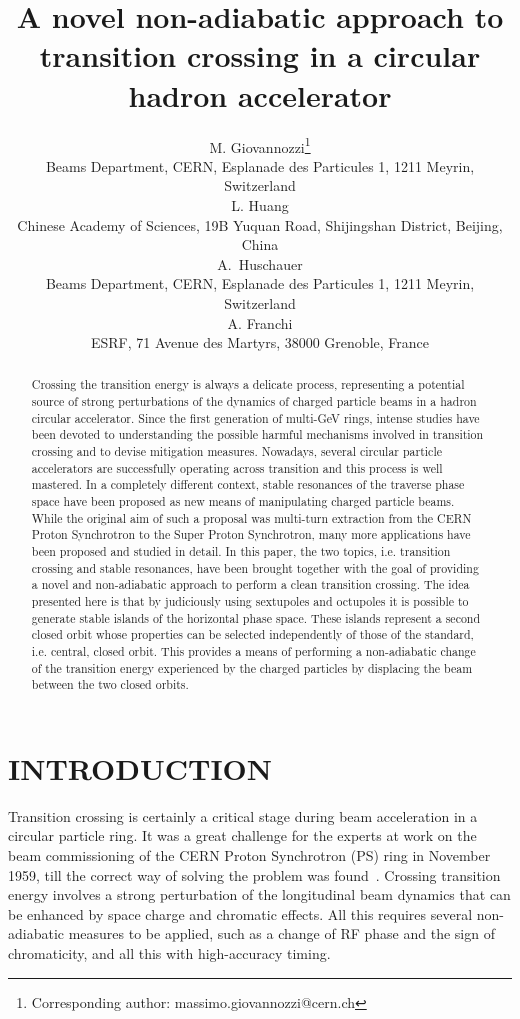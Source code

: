 \documentclass{article}
\title{A novel non-adiabatic approach to transition crossing in a circular hadron accelerator}
\author{M. Giovannozzi\thanks{Corresponding author: massimo.giovannozzi@cern.ch} \\
Beams Department, CERN, Esplanade des Particules 1, 1211 Meyrin, Switzerland \\
\And
L. Huang \\
Chinese Academy of Sciences, 19B Yuquan Road, Shijingshan District, Beijing, China \\
\And
A.~Huschauer \\
Beams Department, CERN, Esplanade des Particules 1, 1211 Meyrin, Switzerland \\
\And
A. Franchi \\
ESRF, 71 Avenue des Martyrs, 38000 Grenoble, France}
\begin{document}
\maketitle
%
\begin{abstract}  
Crossing the transition energy is always a delicate process, representing a potential source of strong perturbations of the dynamics of charged particle beams in a hadron circular accelerator. Since the first generation of multi-GeV rings, intense studies have been devoted to understanding the possible harmful mechanisms involved in transition crossing and to devise mitigation measures. Nowadays, several circular particle accelerators are successfully operating across transition and this process is well mastered. In a completely different context, stable resonances of the traverse phase space have been proposed as new means of manipulating charged particle beams. While the original aim of such a proposal was multi-turn extraction from the CERN Proton Synchrotron to the Super Proton Synchrotron, many more applications have been proposed and studied in detail. In this paper, the two topics, i.e. transition crossing and stable resonances, have been brought together with the goal of providing a novel and non-adiabatic approach to perform a clean transition crossing. The idea presented here is that by judiciously using sextupoles and octupoles it is possible to generate stable islands of the horizontal phase space. These islands represent a second closed orbit whose properties can be selected independently of those of the standard, i.e. central, closed orbit. This provides a means of performing a non-adiabatic change of the transition energy experienced by the charged particles by displacing the beam between the two closed orbits. 
\end{abstract}
%
\section{INTRODUCTION}
%
Transition crossing is certainly a critical stage during beam acceleration in a circular particle ring. It was a great challenge for the experts at work on the beam commissioning of the CERN Proton Synchrotron (PS) ring in November 1959, till the correct way of solving the problem was found~\cite{courrier}. Crossing transition energy involves a strong perturbation of the longitudinal beam dynamics that can be enhanced by space charge and chromatic effects. All this requires several non-adiabatic measures to be applied, such as a change of RF phase and the sign of chromaticity, and all this with high-accuracy timing. 
\end{document}
